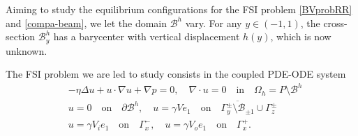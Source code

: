 \documentclass[11pt,a4paper]{amsart}
\theoremstyle{remark}
\theoremstyle{definition}
\numberwithin{equation}{section}
\numberwithin{proposition}{section}
\begin{document}
Aiming to study the equilibrium configurations for the FSI problem \eqref{BVprobRR} and \eqref{compa-beam}, we let the domain $\mathcal{B}^h$ vary.
     For any $y\in(-1,1)$, the cross-section $\mathcal{B}_y^h$ has a barycenter with vertical displacement $h(y)$, which is now unknown.  \par
     The FSI problem we are led to study consists in the coupled PDE-ODE system
     \begin{equation}\label{BVprobR}
		\begin{aligned}
			&-\eta\Delta u+u\cdot\nabla u+\nabla p=0,\quad\nabla\cdot u=0 \quad \text{in}\quad \Omega_h=P\setminus \mathcal{B}^h\\[2pt]
			&u=0 \quad \text{on} \quad  \partial \mathcal{B}^h ,\quad u=\gamma Ve_1\quad \text{on} \quad \overline{\Gamma_{y}^\pm \setminus \mathcal{B}_{\pm 1}}\cup\Gamma_z^\pm\\[2pt]
			&u= \gamma V_ie_1\quad \text{on} \quad \Gamma_x^-,\quad u= \gamma V_oe_1\quad\text{on} \quad \Gamma_x^+.
		\end{aligned}
	\end{equation}
\end{document}
